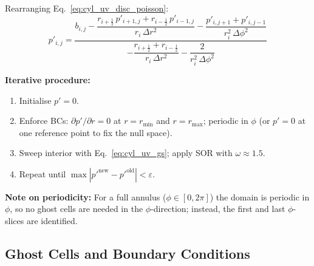 Rearranging Eq.~\eqref{eq:cyl_uv_disc_poisson}:
\begin{equation}
    p'_{i,j} = \frac{b_{i,j}
      - \dfrac{r_{i+\frac{1}{2}}\,p'_{i+1,j}+r_{i-\frac{1}{2}}\,p'_{i-1,j}}{r_i\,\Delta r^2}
      - \dfrac{p'_{i,j+1}+p'_{i,j-1}}{r_i^2\,\Delta\phi^2}
    }
    {-\dfrac{r_{i+\frac{1}{2}}+r_{i-\frac{1}{2}}}{r_i\,\Delta r^2}
     -\dfrac{2}{r_i^2\,\Delta\phi^2}}
    \label{eq:cyl_uv_gs}
\end{equation}

\textbf{Iterative procedure:}
\begin{enumerate}
    \item Initialise $p'=0$.
    \item Enforce BCs: $\partial p'/\partial r=0$ at $r=r_\text{min}$ and $r=r_\text{max}$;
          periodic in $\phi$ (or $p'=0$ at one reference point to fix the null space).
    \item Sweep interior with Eq.~\eqref{eq:cyl_uv_gs}; apply SOR with $\omega \approx 1.5$.
    \item Repeat until $\max|p'^{\text{new}}-p'^{\text{old}}|<\varepsilon$.
\end{enumerate}

\textbf{Note on periodicity:} For a full annulus ($\phi\in[0,2\pi]$) the domain is periodic in $\phi$, so no ghost cells are needed in the $\phi$-direction; instead, the first and last $\phi$-slices are identified.

\subsection{Ghost Cells and Boundary Conditions}

